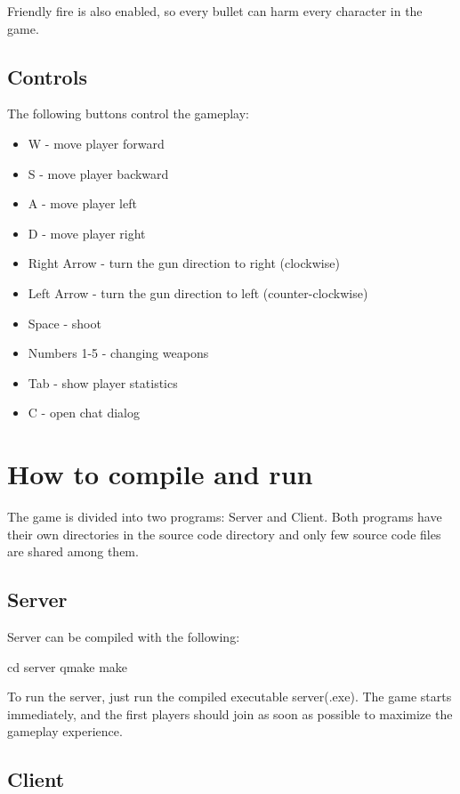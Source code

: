 \documentclass[a4paper,12pt,titlepage]{article}
\begin{document}
Friendly fire is also enabled, so every bullet can harm every character in the game.
\subsection{Controls}
The following buttons control the gameplay:
\begin{itemize}
\item W - move player forward
\item S - move player backward
\item A - move player left
\item D - move player right
\item Right Arrow - turn the gun direction to right (clockwise)
\item Left Arrow - turn the gun direction to left (counter-clockwise)
\item Space - shoot
\item Numbers 1-5 - changing weapons
\item Tab - show player statistics
\item C - open chat dialog
\end{itemize}

\section{How to compile and run}

The game is divided into two programs: Server and Client. Both programs have their own directories in the source code directory and only few source code files are shared among them.

\subsection{Server}

Server can be compiled with the following:
    \begin{verbatimtab}[3]
        cd server
        qmake
        make
    \end{verbatimtab}

To run the server, just run the compiled executable server(.exe). The game starts immediately, and the first players should join as soon as possible to maximize the gameplay experience.

\subsection{Client}
\end{document}
